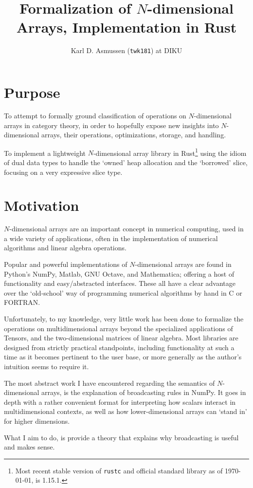 \documentclass[a4paper,11pt,notitlepage]{article}
\author{Karl D. Asmussen (\texttt{twk181}) at DIKU}
\title{Formalization of \(N\)-dimensional Arrays, Implementation in Rust}
\begin{document}
\First

\section{Purpose}

To attempt to formally ground classification of operations on \(N\)-dimensional arrays in category
theory, in order to hopefully expose new insights into \(N\)-dimensional arrays,
their operations, optimizations, storage, and handling.

To implement a lightweight \(N\)-dimensional array library in Rust\footnote{Most recent
stable version of \texttt{rustc} and official standard library as of \today, is 1.15.1.}
using the idiom of dual data types to handle the `owned' heap allocation and the `borrowed' slice,
focusing on a very expressive slice type.

\section{Motivation}

\(N\)-dimensional arrays are an important concept in numerical computing, used in
a wide variety of applications, often in the implementation of numerical algorithms and
linear algebra operations.

Popular and powerful implementations of \(N\)-dimensional arrays are found in Python's NumPy,
Matlab, GNU Octave, and Mathematica; offering a host of functionality and easy/abstracted interfaces.
These all have a clear advantage over the `old-school' way of programming numerical algorithms
by hand in C or FORTRAN.

Unfortunately, to my knowledge, very little work has been done to formalize the operations
on multidimensional arrays beyond the specialized applications of Tensors, and the two-dimensional
matrices of linear algebra. Most libraries are designed from strictly practical standpoints, including
functionality at such a time as it becomes pertinent to the user base, or more generally as the author's
intuition seems to require it.

The most abstract work I have encountered regarding the semantics of \(N\)-dimensional arrays, is the
explanation of broadcasting rules in NumPy\cite{scipy17}. It goes in depth with a rather convenient format
for interpreting how scalars interact in multidimensional contexts, as well as how lower-dimensional arrays
can `stand in' for higher dimensions.

What I aim to do, is provide a theory that explains why broadcasting is useful and makes sense.
\end{document}
